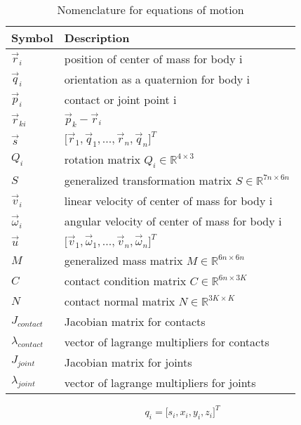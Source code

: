 \begin {table}[htb!]
\begin{center}
\begin{tabular}{|l| l|}
\hline
{\bf Symbol} & {\bf Description} \\  \hline
$\vec{r}_i$ & position of center of mass for body i  \\ \hline
$\vec{q}_i$ & orientation as a quaternion for body i  \\ \hline
$\vec{p}_i$ & contact or joint point i  \\ \hline
$\vec{r}_{ki}$ & $\vec{p}_k - \vec{r}_i$  \\ \hline
$\vec{s}$ & $\lbrack \vec{r}_1, \vec{q}_1,...,\vec{r}_n, \vec{q}_n \rbrack ^T $\\ \hline
$Q_i$ & rotation matrix $Q_i \in  \mathbb{R}^{4 \times 3}$  \\ \hline
$S$ & generalized transformation matrix $ S \in \mathbb{R}^{7n \times 6n}$  \\ \hline
$\vec{v}_i$ & linear velocity of  center of mass for body i  \\ \hline
$\vec{\omega}_i$ & angular velocity of center of mass for body i  \\ \hline
$\vec{u}$ & $\lbrack \vec{v}_1, \vec{\omega}_1,...,\vec{v}_n, \vec{\omega}_n \rbrack ^T $\\ \hline
$M$ & generalized mass matrix $ M \in \mathbb{R}^{6n \times 6n}$  \\ \hline
$C$ & contact condition matrix  $ C \in \mathbb{R}^{6n \times 3K}$ \\ \hline
$N$ & contact normal matrix  $ N \in \mathbb{R}^{3K \times K}$\\ \hline
$J_{contact}$ & Jacobian matrix for contacts  \\ \hline
$\lambda_{contact}$ & vector of lagrange multipliers for contacts  \\ \hline
$J_{joint}$ & Jacobian matrix for joints  \\ \hline
$\lambda_{joint}$ & vector of lagrange multipliers for joints  \\ \hline
\end {tabular}
\end{center}
\caption {Nomenclature for equations of motion} \label{tab:eom}
\end {table}

\begin{equation} \label{eq:vectorqi}
q_i = \lbrack s_i, x_i, y_i, z_i \rbrack ^T
\end{equation}

